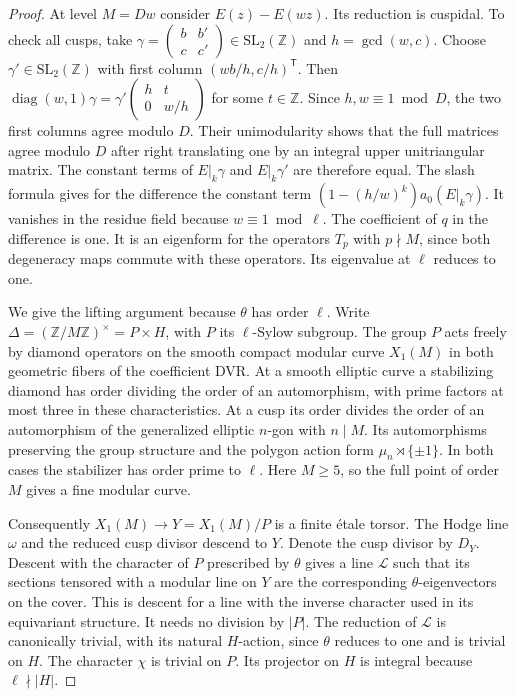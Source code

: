 \documentclass[a4paper,11pt]{article}
\theoremstyle{definition}
\theoremstyle{remark}
\newcommand{\ZZ}{\mathbb Z}\newcommand{\ord}{\operatorname{ord}}
\numberwithin{equation}{section}
\begin{document}
\begin{proof}
At level \(M=Dw\) consider \(E(z)-E(wz)\). Its reduction is cuspidal.
To check all cusps, take
\(\gamma=\left(\begin{smallmatrix}b&b'\\c&c'\end{smallmatrix}\right)
\in\mathrm{SL}_2(\ZZ)\) and \(h=\gcd(w,c)\).
Choose \(\gamma'\in\mathrm{SL}_2(\ZZ)\) with first column
\((wb/h,c/h)^{\mathsf T}\). Then
\(\operatorname{diag}(w,1)\gamma
=\gamma'\left(\begin{smallmatrix}h&t\\0&w/h\end{smallmatrix}\right)\)
for some \(t\in\ZZ\). Since \(h,w\equiv1\bmod D\), the two
first columns agree modulo \(D\). Their unimodularity shows that
the full matrices agree modulo \(D\) after right translating one
by an integral upper unitriangular matrix. The constant terms
of \(E|_k\gamma\) and \(E|_k\gamma'\) are therefore equal.
The slash formula gives for the difference the constant term
\((1-(h/w)^k)a_0(E|_k\gamma)\). It vanishes in the residue
field because \(w\equiv1\bmod\ell\). The coefficient of \(q\)
in the difference is one. It is an eigenform for the operators
\(T_p\) with \(p\nmid M\), since both degeneracy maps commute
with these operators. Its eigenvalue at \(\ell\) reduces to one.

We give the lifting argument because \(\theta\) has order \(\ell\).
Write \(\Delta=(\ZZ/M\ZZ)^\times=P\times H\), with \(P\) its
\(\ell\)-Sylow subgroup. The group \(P\) acts freely by diamond
operators on the smooth compact modular curve \(X_1(M)\) in
both geometric fibers of the coefficient DVR. At a smooth
elliptic curve a stabilizing diamond has order dividing the
order of an automorphism, with prime factors at most three in
these characteristics. At a cusp its order divides the order
of an automorphism of the generalized elliptic \(n\)-gon with
\(n\mid M\). Its automorphisms preserving the group structure
and the polygon action form \(\mu_n\rtimes\{\pm1\}\).
In both cases the stabilizer has order prime to \(\ell\).
Here \(M\ge5\), so the full point of order \(M\) gives a fine
modular curve.~\cite{VII-V-katz361,VII-V-rapoport361}

Consequently \(X_1(M)\to Y=X_1(M)/P\) is a finite étale
torsor. The Hodge line \(\omega\) and the reduced cusp divisor
descend to \(Y\). Denote the cusp divisor by \(D_Y\). Descent with the
character of \(P\) prescribed by \(\theta\) gives a line
\(\mathcal L\) such that its sections tensored with a modular
line on \(Y\) are the corresponding \(\theta\)-eigenvectors
on the cover. This is descent for a line with the inverse
character used in its equivariant structure. It needs no
division by \(|P|\). The reduction of \(\mathcal L\) is
canonically trivial, with its natural \(H\)-action, since
\(\theta\) reduces to one and is trivial on \(H\).
The character \(\chi\) is trivial on \(P\). Its projector on
\(H\) is integral because \(\ell\nmid |H|\).


\end{proof}
\end{document}
